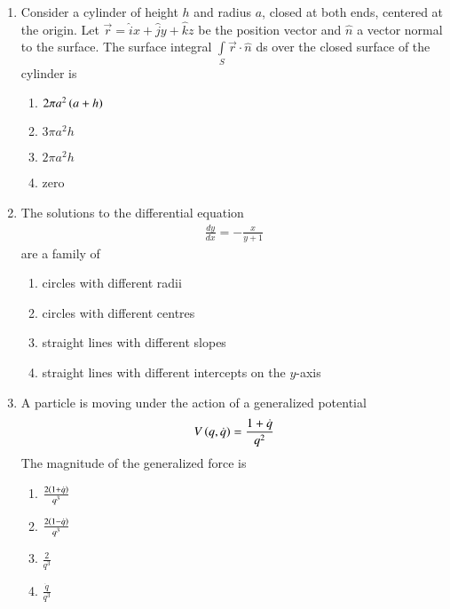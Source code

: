 \documentclass[journal]{IEEEtran}
\begin{document}
\begin{enumerate}
	\item Consider a cylinder of height $h$ and radius $a$, closed at both ends, centered at the origin. Let $\vec{r}=\hat{i}x+\hat{j}y+\hat{k}z$ be the position vector and $\hat{n}$ a vector normal to the surface. The surface integral $\displaystyle \int\limits_{S} \vec{r}\cdot \hat{n}$ ds
over the closed surface of the cylinder is

\begin{multicols}{2}
\begin{enumerate}
    \item $2\pi a^2\left(a+h\right)$
    \item $3\pi a^2h$
    \item $2\pi a^2h$
    \item zero
\end{enumerate}
\end{multicols}
\item The solutions to the differential equation 
\begin{align*}
\frac{dy}{dx}=-\frac{x}{y+1}
\end{align*}
 are a family of
\begin{enumerate}
    \item circles with different radii
    \item circles with different centres
    \item straight lines with different slopes
    \item straight lines with different intercepts on the $y$-axis
\end{enumerate}
\item A particle is moving under the action of a generalized potential
\begin{align*}
    V\left(q,\dot{q}\right)=\frac{1+\dot{q}}{q^2}
\end{align*}
The magnitude of the generalized force is
\begin{multicols}{4}
    \begin{enumerate}
        \item $\frac{2\left(1+\dot{q}\right)}{q^3}$
        \item $\frac{2\left(1-\dot{q}\right)}{q^3}$
        \item $\frac{2}{q^3}$
        \item $\frac{\dot{q}}{q^3}$
    \end{enumerate}

\end{multicols}
\end{enumerate}
\end{document}
